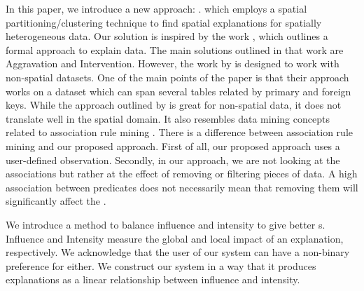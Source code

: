
In this paper, we introduce a new approach: {\solution}. which employs a spatial partitioning/clustering technique to find spatial explanations for spatially heterogeneous data. Our solution is inspired by the work \cite{roy2014formal}, which outlines a formal approach to explain data. The main solutions outlined in that work are Aggravation and Intervention. However, the work by \cite{roy2014formal} is designed to work with non-spatial datasets. One of the main points of the paper is that their approach works on a dataset which can span several tables related by primary and foreign keys. While the approach outlined by \cite{roy2014formal} is great for non-spatial data, it does not translate well in the spatial domain. 
It also resembles data mining concepts related to association rule mining \cite{agarwal1994fast,tan2006introduction}. 
There is a difference between association rule mining and our proposed approach. First of all, our proposed approach uses a user-defined observation. Secondly, in our approach, we are not looking at the associations but rather at the effect of removing or filtering pieces of data. A high association between predicates does not necessarily mean that removing them will significantly affect the {\fact}.


We introduce a method to balance influence and intensity to give better {\explanation}s. Influence and Intensity measure the global and local impact of an explanation, respectively. We acknowledge that the user of our system can have a non-binary preference for either. We construct our system in a way that it produces explanations as a linear relationship between influence and intensity.


